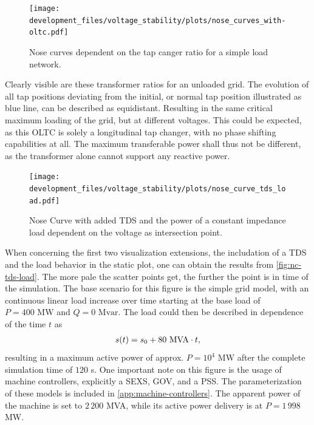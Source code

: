 \begin{figure}[htbp!]
    \centering
    \texttt{[image: development\_files/voltage\_stability/plots/nose\_curves\_with-oltc.pdf]}
    \caption[Nose curves dependent on the tap changer ratio for a simple load network]{Nose curves dependent on the tap canger ratio for a simple load network.}
    \label{fig:oltc-nose-curve}
\end{figure}

Clearly visible are these transformer ratios for an unloaded grid.
The evolution of all tap positions deviating from the initial, or normal tap position illustrated as blue line, can be described as equidistant.
Resulting in the same critical maximum loading of the grid, but at different voltages.
This could be expected, as this \acs{OLTC} is solely a longitudinal tap changer, with no phase shifting capabilities at all.
The maximum transferable power shall thus not be different, as the transformer alone cannot support any reactive power.

\begin{figure}[htbp!]
    \centering
    \texttt{[image: development\_files/voltage\_stability/plots/nose\_curve\_tds\_load.pdf]}
    \caption{Nose Curve with added \acs{TDS} and the power of a constant impedance load dependent on the voltage as intersection point.}
    \label{fig:nc-tds-load}
\end{figure}

When concerning the first two visualization extensions, the includation of a \acs{TDS} and the load behavior in the static plot, one can obtain the results from \autoref{fig:nc-tds-load}.
The more pale the scatter points get, the further the point is in time of the simulation.
The base scenario for this figure is the simple grid model, with an continuous linear load increase over time starting at the base load of $P=400\text{ MW}$ and $Q=0\text{ Mvar}$.
The load could then be described in dependence of the time $t$ as 
\begin{align}
    s(t) = s_0 + 80\text{ MVA} \cdot t \notag,
\end{align}
resulting in a maximum active power of approx. $P=10^4\text{ MW}$ after the complete simulation time of $120$ s.
One important note on this figure is the usage of machine controllers, explicitly a \ac{SEXS}, \ac{GOV}, and a \ac{PSS}.
The parameterization of these models is included in \autoref{app:machine-controllers}.
The apparent power of the machine is set to $2\,200$ MVA, while its active power delivery is at $P=1\,998$ MW.


